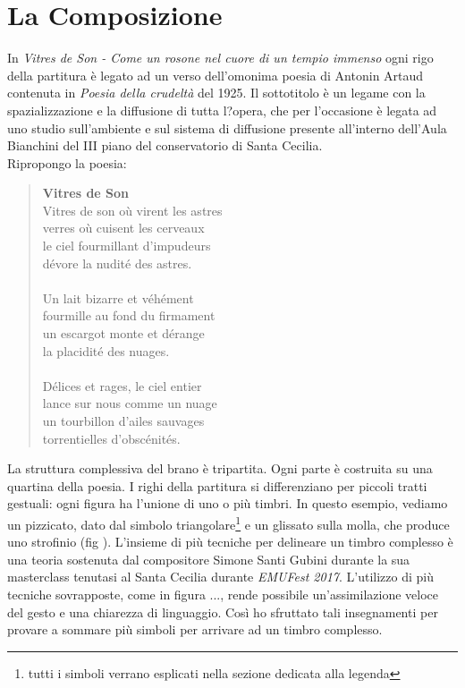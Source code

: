 
\chapter{La Composizione}
\label{chp:La Composizione}
In \textit{Vitres de Son - Come un rosone nel cuore di un tempio immenso} ogni rigo della partitura è legato ad un verso dell'omonima poesia di Antonin Artaud contenuta in \textit{Poesia della crudeltà} del 1925. Il sottotitolo è un legame con la spazializzazione e la diffusione di tutta l?opera, che per l'occasione è legata ad uno studio sull'ambiente e sul sistema di diffusione presente all'interno dell'Aula Bianchini del III piano del conservatorio di Santa Cecilia. \\
Ripropongo la poesia:

\begin{quotation}
\textbf{Vitres de Son} \\
Vitres de son où virent les astres \\
verres où cuisent les cerveaux \\
le ciel fourmillant d'impudeurs \\
dévore la nudité des astres. \\ \\
Un lait bizarre et véhément \\
fourmille au fond du firmament \\
un escargot monte et dérange \\
la placidité des nuages. \\ \\
Délices et rages, le ciel entier \\
lance sur nous comme un nuage \\
un tourbillon d'ailes sauvages \\
torrentielles d'obscénités.\\
\end{quotation}

La struttura complessiva del brano è tripartita. Ogni parte è costruita su una quartina della poesia. I righi della partitura si differenziano per piccoli tratti gestuali: ogni figura ha l'unione di uno o più timbri. In questo esempio, vediamo un pizzicato, dato dal simbolo triangolare\footnote{tutti i simboli verrano esplicati nella sezione dedicata alla legenda} e un glissato sulla molla, che produce uno strofinio (fig ). L'insieme di più tecniche per delineare un timbro complesso è una teoria sostenuta dal compositore Simone Santi Gubini durante la sua masterclass tenutasi al Santa Cecilia durante \textit{EMUFest 2017}. L'utilizzo di più tecniche sovrapposte, come in figura ..., rende possibile un'assimilazione veloce del gesto e una chiarezza di linguaggio. Così ho sfruttato tali insegnamenti per provare a sommare più simboli per arrivare ad un timbro complesso.

